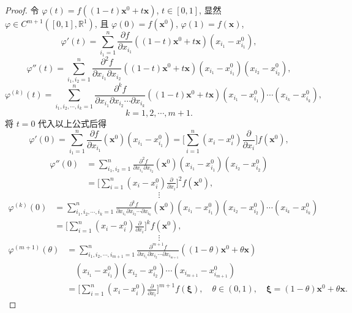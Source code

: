 \begin{proof}
令 $\varphi(t) = f((1 - t)\boldsymbol{x}^{0} + t\boldsymbol{x})$, $t \in [0, 1]$, 显然 $\varphi \in C^{m+1}([0, 1], \mathbb{R}^{1})$, 且 $\varphi(0) = f(\boldsymbol{x}^{0})$, $\varphi(1) = f(\boldsymbol{x})$,
\[
  \varphi'(t) = \sum_{i_{1}=1}^{n}\frac{\partial f}{\partial x_{i_{1}}}((1 - t)\boldsymbol{x}^{0} + t\boldsymbol{x})(x_{i_{1}} - x_{i_{1}}^{0}),
\]
\[
  \varphi''(t) = \sum_{i_{1}, i_{2}=1}^{n}\frac{\partial^{2}f}{\partial x_{i_{1}}\partial x_{i_{2}}}((1 - t)\boldsymbol{x}^{0} + t\boldsymbol{x})(x_{i_{1}} - x_{i_{1}}^{0})(x_{i_{2}} - x_{i_{2}}^{0}),
\]
\[
  \varphi^{(k)}(t) = \sum_{i_{1}, i_{2}, \cdots, i_{k}=1}^{n}\frac{\partial^{k}f}{\partial x_{i_{1}}\partial x_{i_{2}}\cdots\partial x_{i_{k}}}((1 - t)\boldsymbol{x}^{0} + t\boldsymbol{x})(x_{i_{1}} - x_{i_{1}}^{0})\cdots(x_{i_{k}} - x_{i_{k}}^{0}),
\]
\[
  k = 1, 2, \cdots, m + 1.
\]
将 $t = 0$ 代入以上公式后得
\[
  \varphi'(0) = \sum_{i_{1}=1}^{n}\frac{\partial f}{\partial x_{i_{1}}}(\boldsymbol{x}^{0})(x_{i_{1}} - x_{i_{1}}^{0}) = \Big[\sum_{i=1}^{n}(x_{i} - x_{i}^{0})\frac{\partial}{\partial x_{i}}\Big]f(\boldsymbol{x}^{0}),
\]
\begin{align*}
  \varphi''(0) &= \sum_{i_{1}, i_{2}=1}^{n}\frac{\partial^{2}f}{\partial x_{i_{1}}\partial x_{i_{2}}}(\boldsymbol{x}^{0})(x_{i_{1}} - x_{i_{1}}^{0})(x_{i_{2}} - x_{i_{2}}^{0}) \\
  &= \Big[\sum_{i=1}^{n}(x_{i} - x_{i}^{0})\frac{\partial}{\partial x_{i}}\Big]^{2}f(\boldsymbol{x}^{0}),
\end{align*}
\[
  \vdots
\]
\begin{align*}
  \varphi^{(k)}(0) &= \sum_{i_{1}, i_{2}, \cdots, i_{k}=1}^{n}\frac{\partial^{k}f}{\partial x_{i_{1}}\partial x_{i_{2}}\cdots\partial x_{i_{k}}}(\boldsymbol{x}^{0})(x_{i_{1}} - x_{i_{1}}^{0})(x_{i_{2}} - x_{i_{2}}^{0})\cdots(x_{i_{k}} - x_{i_{k}}^{0}) \\
  &= \Big[\sum_{i=1}^{n}(x_{i} - x_{i}^{0})\frac{\partial}{\partial x_{i}}\Big]^{k}f(\boldsymbol{x}^{0}),
\end{align*}
\[
  \vdots
\]
\begin{align*}
  \varphi^{(m+1)}(\theta) &= \sum_{i_{1}, i_{2}, \cdots, i_{m+1}=1}^{n}\frac{\partial^{m+1}f}{\partial x_{i_{1}}\partial x_{i_{2}}\cdots\partial x_{i_{m+1}}}((1 - \theta)\boldsymbol{x}^{0} + \theta\boldsymbol{x}) \\
  &\quad (x_{i_{1}} - x_{i_{1}}^{0})(x_{i_{2}} - x_{i_{2}}^{0})\cdots(x_{i_{m+1}} - x_{i_{m+1}}^{0}) \\
  &= \Big[\sum_{i=1}^{n}(x_{i} - x_{i}^{0})\frac{\partial}{\partial x_{i}}\Big]^{m+1}f(\boldsymbol{\xi}), \quad \theta \in (0, 1), \quad \boldsymbol{\xi} = (1 - \theta)\boldsymbol{x}^{0} + \theta\boldsymbol{x}.

\end{align*}
\end{proof}
